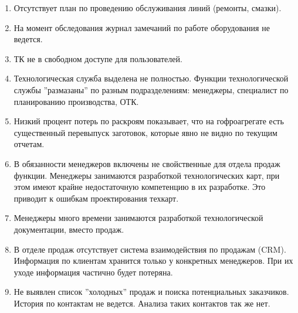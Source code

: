 \begin{enumerate}



\item 	Отсутствует план по проведению обслуживания линий (ремонты, смазки).

\item 	На момент обследования журнал замечаний по работе оборудования не ведется.

\item ТК не в свободном доступе для пользователей.

\item Технологическая служба выделена не полностью. Функции технологической службы 
''размазаны'' по разным подразделениям: менеджеры, специалист по планированию производства, ОТК.

\item Низкий процент потерь по раскроям показывает, что на гофроагрегате есть существенный перевыпуск заготовок, которые явно не видно по текущим отчетам. 


\item В обязанности менеджеров включены не свойственные для отдела продаж функции. Менеджеры занимаются разработкой технологических карт, при этом имеют крайне недостаточную компетенцию в их разработке. Это приводит к ошибкам проектирования техкарт.

\item Менеджеры много времени занимаются разработкой технологической документации, вместо продаж.

\item В отделе продаж отсутствует система взаимодействия по продажам (CRM). Информация по клиентам хранится только у конкретных менеджеров. При их уходе информация частично будет потеряна.

\item Не выявлен список ''холодных'' продаж и поиска потенциальных заказчиков. История по контактам не ведется. Анализа таких контактов так же нет.



\end{enumerate}
